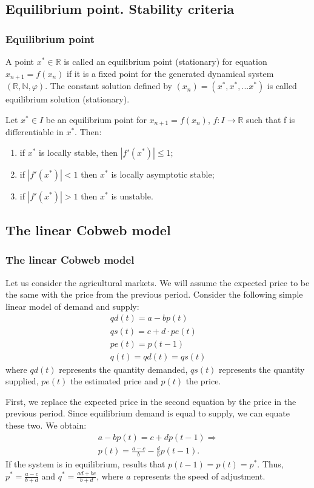 \documentclass[11]{beamer}
\newcommand{\R}{\mathbb{R}}
\newcommand{\xstar}{x^{*}}
\begin{document}
\subsection{Equilibrium point. Stability criteria}
\begin{frame}
 \frametitle{Equilibrium point}
 \begin{definition}
 A point $\xstar\in\R$ is called an equilibrium point (stationary) for equation $ x_{n+1}=f(x_{n})$ if it is a fixed point for the generated dynamical system $(\R,\mathbb{N},\varphi)$. The constant solution defined by $(x_{n})=(\xstar,\xstar,...\xstar)$ is called equilibrium solution (stationary).
\end{definition}

\end{frame}
\begin{frame}
\begin{theorem}\label{2.3.2.3.}
 Let $\xstar\in I$ be an equilibrium point for $ x_{n+1}=f(x_{n})$, $f:I\rightarrow\R$ such that f is differentiable in $\xstar$. Then:
 \begin{enumerate}
  \item if $\xstar$ is locally stable, then $|f'(\xstar)|\leq 1$;
  \item if $|f'(\xstar)|<1$ then $\xstar$ is locally asymptotic stable;
  \item if $|f'(\xstar)|>1$ then $\xstar$ is unstable.
 \end{enumerate}
\end{theorem}
\end{frame}

\subsection{The linear Cobweb model}
\begin{frame}
\frametitle{The linear Cobweb model}
Let us consider the agricultural markets. We will assume the expected price to be the same with the price from the previous period. Consider the following simple linear model of demand and supply:
\begin{align}
 qd(t)=a-bp(t) \\
 qs(t)=c+d\cdot pe(t)\\
 pe(t)=p(t-1)\\
 q(t)=qd(t)=qs(t)
\end{align}
where $qd(t)$ represents the quantity demanded, $qs(t)$ represents the quantity supplied, $pe(t)$ the estimated price and $p(t)$ the price. 
\end{frame}
\begin{frame}
First, we replace the expected price in the second equation by the price in the previous period. Since equilibrium demand is equal to supply, we can equate these two. We obtain:
\begin{align*}
 a-bp(t)=c+dp(t-1)\Rightarrow \\
 p(t)=\frac{a-c}{b}-\frac{d}{b}p(t-1).
\end{align*}
If the system is in equilibrium, results that $p(t-1)=p(t)=p^{*}$. Thus, $p^{*}=\frac{a-c}{b+d}$ and $q^{*}=\frac{ad+bc}{b+d}$, where $a$ represents the speed of adjustment.
\end{frame}
\end{document}
